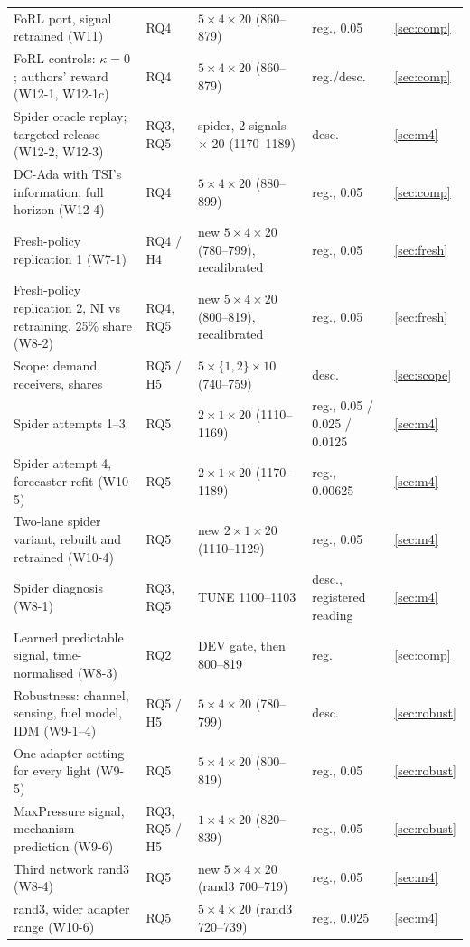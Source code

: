 \begin{table}[t]
\begin{tabular}{@{}p{5.3cm}p{1.5cm}p{6.0cm}p{2.5cm}l@{}}
FoRL port, signal retrained (W11) & RQ4 & $5\times4\times20$ (860--879) & reg., 0.05 & \ref{sec:comp}\\
FoRL controls: $\kappa=0$; authors' reward (W12-1, W12-1c) & RQ4 & $5\times4\times20$ (860--879) & reg./desc. & \ref{sec:comp}\\
Spider oracle replay; targeted release (W12-2, W12-3) & RQ3, RQ5 & spider, 2 signals $\times$ 20 (1170--1189) & desc. & \ref{sec:m4}\\
DC-Ada with TSI's information, full horizon (W12-4) & RQ4 & $5\times4\times20$ (880--899) & reg., 0.05 & \ref{sec:comp}\\
Fresh-policy replication 1 (W7-1) & RQ4 / H4 & new $5\times4\times20$ (780--799), recalibrated & reg., 0.05 & \ref{sec:fresh}\\
Fresh-policy replication 2, NI vs retraining, 25\% share (W8-2) & RQ4, RQ5 & new $5\times4\times20$ (800--819), recalibrated & reg., 0.05 & \ref{sec:fresh}\\
Scope: demand, receivers, shares & RQ5 / H5 & $5\times\{1,2\}\times10$ (740--759) & desc. & \ref{sec:scope}\\
Spider attempts 1--3 & RQ5 & $2\times1\times20$ (1110--1169) & reg., 0.05 / 0.025 / 0.0125 & \ref{sec:m4}\\
Spider attempt 4, forecaster refit (W10-5) & RQ5 & $2\times1\times20$ (1170--1189) & reg., 0.00625 & \ref{sec:m4}\\
Two-lane spider variant, rebuilt and retrained (W10-4) & RQ5 & new $2\times1\times20$ (1110--1129) & reg., 0.05 & \ref{sec:m4}\\
Spider diagnosis (W8-1) & RQ3, RQ5 & TUNE 1100--1103 & desc., registered reading & \ref{sec:m4}\\
Learned predictable signal, time-normalised (W8-3) & RQ2 & DEV gate, then 800--819 & reg. & \ref{sec:comp}\\
Robustness: channel, sensing, fuel model, IDM (W9-1--4) & RQ5 / H5 & $5\times4\times20$ (780--799) & desc. & \ref{sec:robust}\\
One adapter setting for every light (W9-5) & RQ5 & $5\times4\times20$ (800--819) & reg., 0.05 & \ref{sec:robust}\\
MaxPressure signal, mechanism prediction (W9-6) & RQ3, RQ5 / H5 & $1\times4\times20$ (820--839) & reg., 0.05 & \ref{sec:robust}\\
Third network rand3 (W8-4) & RQ5 & new $5\times4\times20$ (rand3 700--719) & reg., 0.05 & \ref{sec:m4}\\
rand3, wider adapter range (W10-6) & RQ5 & $5\times4\times20$ (rand3 720--739) & reg., 0.025 & \ref{sec:m4}\\

\end{tabular}
\end{table}
